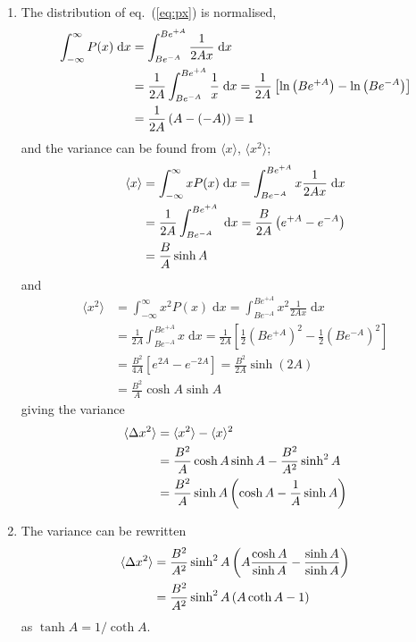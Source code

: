 \documentclass[a4paper,11pt]{article}
\newcommand{\diff}{\ensuremath{\; \text{d}}}
\begin{document}
\begin{enumerate}
    \item The distribution of eq.~(\ref{eq:px}) is normalised,
        \begin{align*}
            \int_{-\infty}^{\infty} P(x) \diff x &= \int_{Be^{-A}}^{Be^{+A}} \frac{1}{2Ax} \diff x \notag \\
            &=  \frac{1}{2A}\int_{Be^{-A}}^{Be^{+A}} \frac{1}{x} \diff x = \frac{1}{2A} \left[ \ln \left( Be^{+A} \right) - \ln \left( Be^{-A} \right) \right] \notag \\
            &=  \frac{1}{2A} \left( A - (-A) \right) = 1
        \end{align*}
        and the variance can be found from $\langle x \rangle$, $\langle x^2 \rangle$;
        \begin{align}
            \langle x \rangle &= \int_{-\infty}^{\infty} x P(x) \diff x = \int_{Be^{-A}}^{Be^{+A}} x \frac{1}{2Ax} \diff x \notag \\
            &=\frac{1}{2A}\int_{Be^{-A}}^{Be^{+A}} \diff x = \frac{B}{2A} \left( e^{+A} - e^{-A}  \right) \notag \\
            &= \frac{B}{A} \sinh A
            \label{eq:mean_powerPX}
        \end{align}
        and
        \begin{align*}
            \langle x^2 \rangle &= \int_{-\infty}^{\infty} x^2 P(x) \diff x = \int_{Be^{-A}}^{Be^{+A}} x^2 \frac{1}{2Ax} \diff x \\
            &=\frac{1}{2A}\int_{Be^{-A}}^{Be^{+A}} x \diff x = \frac{1}{2A} \left[ \frac{1}{2} (Be^{+A})^2 - \frac{1}{2}(Be^{-A})^2  \right] \\
            &= \frac{B^2}{4A} \left[ e^{2A} - e^{-2A} \right] = \frac{B^2}{2A} \sinh \left( 2A \right) \\
            &= \frac{B^2}{A} \cosh A \sinh A
        \end{align*}
        giving the variance 
        \begin{align}
        \langle \Delta x^2 \rangle &= \langle x^2 \rangle - \langle x \rangle^2 \notag \\
        &= \frac{B^2}{A} \cosh A \sinh A - \frac{B^2}{A^2} \sinh^2 A \notag \\
        &= \frac{B^2}{A} \sinh A \left( \cosh A - \frac{1}{A} \sinh A \right)
            \label{eq:var_1}
        \end{align}

    \item The variance can be rewritten
        \begin{align}
            \langle \Delta x^2 \rangle &= \frac{B^2}{A^2} \sinh^2 A \left( A \frac{\cosh A}{\sinh A} -\frac{\sinh A}{\sinh A} \right) \notag \\
            &= \frac{B^2}{A^2} \sinh^2 A \left( A \coth A - 1 \right)
            \label{eq:var_2}
        \end{align}
        as $\tanh A = 1/\coth A$. 


\end{enumerate}
\end{document}
